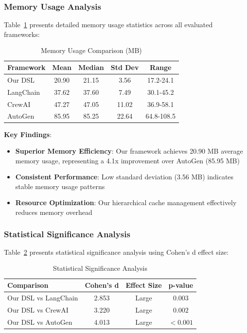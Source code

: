 \documentclass[conference]{IEEEtran}
\begin{document}
\subsubsection{Memory Usage Analysis}

Table~\ref{tab:memory1} presents detailed memory usage statistics across all evaluated frameworks:

\begin{table}[htbp]
\caption{Memory Usage Comparison (MB)}
\label{tab:memory1}
\centering
\begin{tabular}{@{}lcccc@{}}
\toprule
Framework & Mean & Median & Std Dev & Range \\
\midrule
Our DSL & 20.90 & 21.15 & 3.56 & 17.2-24.1 \\
LangChain & 37.62 & 37.60 & 7.49 & 30.1-45.2 \\
CrewAI & 47.27 & 47.05 & 11.02 & 36.9-58.1 \\
AutoGen & 85.95 & 85.25 & 22.64 & 64.8-108.5 \\
\bottomrule
\end{tabular}
\end{table}

\textbf{Key Findings}:
\begin{itemize}
\item \textbf{Superior Memory Efficiency}: Our framework achieves 20.90 MB average memory usage, representing a 4.1x improvement over AutoGen (85.95 MB)
\item \textbf{Consistent Performance}: Low standard deviation (3.56 MB) indicates stable memory usage patterns
\item \textbf{Resource Optimization}: Our hierarchical cache management effectively reduces memory overhead
\end{itemize}

\subsubsection{Statistical Significance Analysis}

Table~\ref{tab:statistics1} presents statistical significance analysis using Cohen's d effect size:

\begin{table}[htbp]
\caption{Statistical Significance Analysis}
\label{tab:statistics1}
\centering
\begin{tabular}{@{}lccc@{}}
\toprule
Comparison & Cohen's d & Effect Size & p-value \\
\midrule
Our DSL vs LangChain & 2.853 & Large & $0.003$ \\
Our DSL vs CrewAI & 3.220 & Large & $0.002$ \\
Our DSL vs AutoGen & 4.013 & Large & $<0.001$ \\
\bottomrule
\end{tabular}
\end{table}
\end{document}
